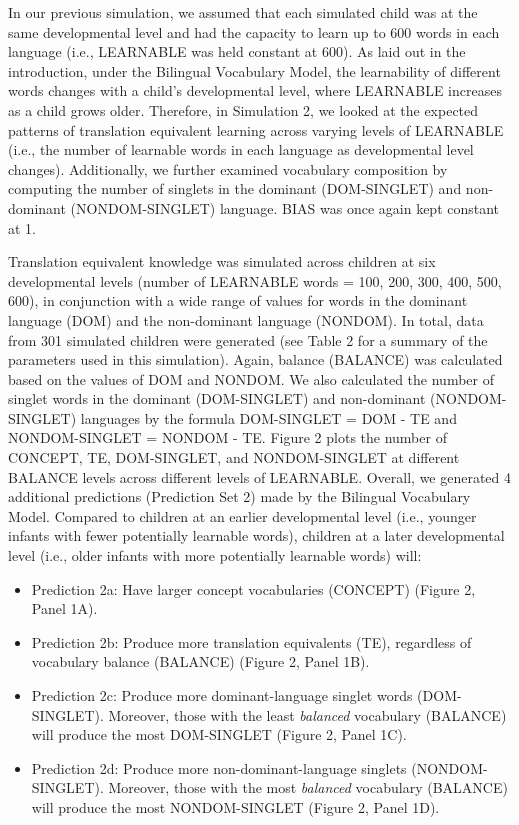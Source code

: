 \documentclass[
  english,
  ,man,floatsintext]{apa6}
\providecommand{\tightlist}{%
  \setlength{\itemsep}{0pt}\setlength{\parskip}{0pt}}
\begin{document}
In our previous simulation, we assumed that each simulated child was at the same developmental level and had the capacity to learn up to 600 words in each language (i.e., LEARNABLE was held constant at 600). As laid out in the introduction, under the Bilingual Vocabulary Model, the learnability of different words changes with a child's developmental level, where LEARNABLE increases as a child grows older. Therefore, in Simulation 2, we looked at the expected patterns of translation equivalent learning across varying levels of LEARNABLE (i.e., the number of learnable words in each language as developmental level changes). Additionally, we further examined vocabulary composition by computing the number of singlets in the dominant (DOM-SINGLET) and non-dominant (NONDOM-SINGLET) language. BIAS was once again kept constant at 1.

Translation equivalent knowledge was simulated across children at six developmental levels (number of LEARNABLE words = 100, 200, 300, 400, 500, 600), in conjunction with a wide range of values for words in the dominant language (DOM) and the non-dominant language (NONDOM). In total, data from 301 simulated children were generated (see Table 2 for a summary of the parameters used in this simulation). Again, balance (BALANCE) was calculated based on the values of DOM and NONDOM. We also calculated the number of singlet words in the dominant (DOM-SINGLET) and non-dominant (NONDOM-SINGLET) languages by the formula DOM-SINGLET = DOM - TE and NONDOM-SINGLET = NONDOM - TE. Figure 2 plots the number of CONCEPT, TE, DOM-SINGLET, and NONDOM-SINGLET at different BALANCE levels across different levels of LEARNABLE. Overall, we generated 4 additional predictions (Prediction Set 2) made by the Bilingual Vocabulary Model. Compared to children at an earlier developmental level (i.e., younger infants with fewer potentially learnable words), children at a later developmental level (i.e., older infants with more potentially learnable words) will:

\begin{itemize}
\tightlist
\item
  Prediction 2a: Have larger concept vocabularies (CONCEPT) (Figure 2, Panel 1A).
\item
  Prediction 2b: Produce more translation equivalents (TE), regardless of vocabulary balance (BALANCE) (Figure 2, Panel 1B).
\item
  Prediction 2c: Produce more dominant-language singlet words (DOM-SINGLET). Moreover, those with the least \emph{balanced} vocabulary (BALANCE) will produce the most DOM-SINGLET (Figure 2, Panel 1C).
\item
  Prediction 2d: Produce more non-dominant-language singlets (NONDOM-SINGLET). Moreover, those with the most \emph{balanced} vocabulary (BALANCE) will produce the most NONDOM-SINGLET (Figure 2, Panel 1D).
\end{itemize}
\end{document}
